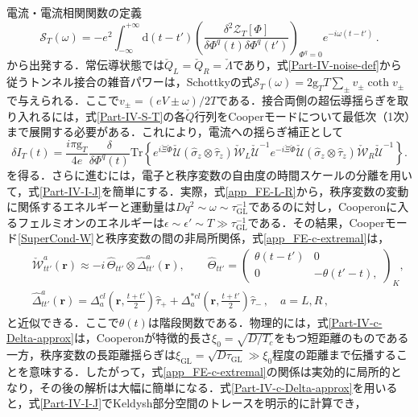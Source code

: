 \documentclass[a4paper,11pt]{ltjsarticle}
\def\Tr{\mathrm{Tr}}
\def\d{\mathrm{d}}
\begin{document}
電流・電流相関関数の定義
\begin{equation}\label{Part-IV-noise-def}
\mathcal{S}_{T}(\omega)=-e^{2}\int^{+\infty}_{-\infty}\d(t-t')
\left(\frac{\delta^{2}\mathcal{Z}_{T}[\Phi]}{\delta
\Phi^{q}(t)\delta
\Phi^{q}(t')}\right)_{\Phi^{q}=0}e^{-i\omega(t-t')}\,.
\end{equation}
から出発する．常伝導状態では$\check{Q}_{L}=\check{Q}_{R}=\check{\Lambda}$であり，式\eqref{Part-IV-noise-def}から従うトンネル接合の雑音パワーは，Schottkyの式$\mathcal{S}_{T}(\omega)=2\mathrm{g}_{T}T\sum_{\pm}v_{\pm}\coth v_{\pm}$で与えられる．ここで$v_{\pm}=(eV\pm\omega)/2T$である．接合両側の超伝導揺らぎを取り入れるには，式\eqref{Part-IV-S-T}の各$\check{Q}$行列をCooperモードについて最低次（1次）まで展開する必要がある．これにより，電流への揺らぎ補正として
\begin{equation}\label{Part-IV-I-J}
\delta I_{T}(t)=\frac{i\pi\mathrm{g}_{T}}{4e}\frac{\delta}{\delta
\Phi^{q}(t)}\Tr\left\{e^{i\check{\Xi}\check{\Phi}}
\check{\mathcal{U}} (\hat{\sigma}_{z}\otimes\hat{\tau}_{z})
\check{\mathcal{W}}_{L}\check{\mathcal{U}}^{-1}
e^{-i\check{\Xi}\check{\Phi}}
\check{\mathcal{U}} (\hat{\sigma}_{z}\otimes\hat{\tau}_{z})
\check{\mathcal{W}}_{R}\check{\mathcal{U}}^{-1}\right\}.
\end{equation}
を得る．さらに進むには，電子と秩序変数の自由度の時間スケールの分離を用いて，式\eqref{Part-IV-I-J}を簡単にする．実際，式\eqref{app_FE-L-R}から，秩序変数の変動に関係するエネルギーと運動量は$Dq^{2}\sim\omega\sim\tau^{-1}_{\mathrm{GL}}$であるのに対し，Cooperonに入るフェルミオンのエネルギーは$\epsilon\sim\epsilon'\sim T\gg \tau^{-1}_{\mathrm{GL}}$である．その結果，Cooperモード\eqref{SuperCond-W}と秩序変数の間の非局所関係，式\eqref{app_FE-c-extremal}は，
\begin{eqnarray}\label{Part-IV-c-Delta-approx}
&& \check{\mathcal{W}}^{a}_{tt'}(\mathbf{r})\approx-i\,
\hat{\Theta}_{tt'}\otimes\hat{\Delta}^{a}_{tt'}(\mathbf{r}),\quad\quad
\hat{\Theta}_{tt'}= \left(\begin{array}{cc} \theta(t-t') & 0 \\
0 & -\theta(t'-t),
\end{array}\right)_K,\nonumber \\
&&
\hat{\Delta}^{a}_{tt'}(\mathbf{r})=\Delta^{cl}_{a}\left(\mathbf{r},\frac{t+t'}{2}\right)
\hat{\tau}_{+}+
\Delta^{*cl}_{a}\left(\mathbf{r},\frac{t+t'}{2}\right)\hat{\tau}_{-}\,,\quad
a=L,R\,,
\end{eqnarray}
と近似できる．ここで$\theta(t)$は階段関数である．物理的には，式\eqref{Part-IV-c-Delta-approx}は，Cooperonが特徴的長さ$\xi_{0}=\sqrt{D/T_{c}}$をもつ短距離のものである一方，秩序変数の長距離揺らぎは$\xi_{\mathrm{GL}}=\sqrt{D\tau_{\mathrm{GL}}}\gg\xi_{0}$程度の距離まで伝播することを意味する．したがって，式\eqref{app_FE-c-extremal}の関係は実効的に局所的となり，その後の解析は大幅に簡単になる．式\eqref{Part-IV-c-Delta-approx}を用いると，式\eqref{Part-IV-I-J}でKeldysh部分空間のトレースを明示的に計算でき，
\end{document}
